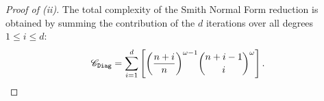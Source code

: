 \begin{proof}[Proof of  (ii)]






The total complexity of the Smith Normal Form reduction is obtained by summing the contribution of the $d$ iterations over all degrees $1\leq i \leq d$:
\begin{align*}
    \mathscr{C}_{\algdiag} %
    = \sum_{i=1}^{d} \left[  {\left(\frac{n+i}{n}\right)}^{\omega-1}\binom{n+i-1}{i}^\omega \right].
\end{align*}


\end{proof}
